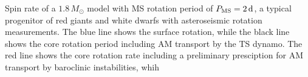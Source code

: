  \label{fig:MRI1.8rot} Spin rate of a $1.8 \, M_\odot$ model with MS rotation period of $P_{\rm MS} = 2 \, {\rm d}$, a typical progenitor of red giants and white dwarfs with asteroseismic rotation measurements. The blue line shows the surface rotation, while the black line shows the core rotation period including AM transport by the TS dynamo. The red line shows the core rotation rate including a preliminary presciption for AM transport by baroclinic instabilities, whih